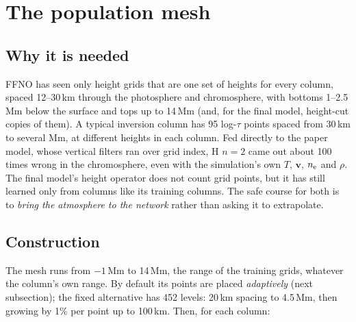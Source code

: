 \section{The population mesh}\label{sec:mesh}

\subsection{Why it is needed}
FFNO has seen only height grids that are one set of heights for every column, spaced 12--30\,km through the photosphere and chromosphere, with bottoms 1--2.5\,Mm below the surface and tops up to 14\,Mm (and, for the final model, height-cut copies of them). A typical inversion column has 95 log-$\tau$ points spaced from 30\,km to several Mm, at different heights in each column. Fed directly to the paper model, whose vertical filters ran over grid index, H $n=2$ came out about 100 times wrong in the chromosphere, even with the simulation's own $T$, $\mathbf v$, $n_{\rm e}$ and $\rho$. The final model's height operator does not count grid points, but it has still learned only from columns like its training columns. The safe course for both is to \emph{bring the atmosphere to the network} rather than asking it to extrapolate.

\subsection{Construction}
The mesh runs from $-1$\,Mm to 14\,Mm, the range of the training grids, whatever the column's own range. By default its points are placed \emph{adaptively} (next subsection); the fixed alternative has 452 levels: 20\,km spacing to 4.5\,Mm, then growing by 1\% per point up to 100\,km. Then, for each column:

